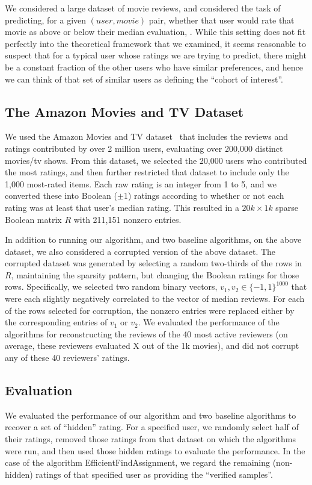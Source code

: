 \documentclass[final,12pt]{colt2018}
\begin{document}
We considered a large dataset of movie reviews, and considered the task of predicting, for a given $(user, movie)$ pair, whether that user would rate that movie as above or below their median evaluation, .  While this setting does not fit perfectly into the theoretical framework that we examined, it seems reasonable to suspect that for a typical user whose ratings we are trying to predict, there might be a constant fraction of the other users who have similar preferences, and hence we can think of that set of similar users as defining the ``cohort of interest''.

\subsection{The Amazon Movies and TV Dataset}
We used the Amazon Movies and TV dataset~\citep{db1, db2} that includes the reviews and ratings contributed by over 2 million users, evaluating over 200,000 distinct movies/tv shows.   From this dataset, we selected the 20,000 users who contributed the most ratings, and then further restricted that dataset to include only the 1,000 most-rated items.  Each raw rating is an integer from 1 to 5,  and we converted these into Boolean ($\pm 1$) ratings according to whether or not each rating was at least that user's median rating.  This resulted in a $20k \times 1k$ sparse Boolean matrix $R$ with 211,151 nonzero entries.

In addition to running our algorithm, and two baseline algorithms, on the above dataset, we also considered a corrupted version of the above dataset.  The corrupted dataset was generated by selecting a random two-thirds of the rows in $R$, maintaining the sparsity pattern, but changing the Boolean ratings for those rows.  Specifically, we selected two random binary vectors, $v_1,v_2 \in \{-1,1\}^{1000}$ that were each slightly negatively correlated to the vector of median reviews.  For each of the rows selected for corruption, the nonzero entries were replaced either by the corresponding entries of $v_1$ or $v_2$.  We evaluated the performance of the algorithms for reconstructing the reviews of the 40 most active reviewers (on average, these reviewers evaluated X out of the 1k movies), and did not corrupt any of these 40 reviewers' ratings.

\subsection{Evaluation}
We evaluated the performance of our algorithm and two baseline algorithms to recover a set of ``hidden'' rating.  For a specified user, we randomly select half of their ratings, removed those ratings from that dataset on which the algorithms were run, and then used those hidden ratings to evaluate the performance.   In the case of the algorithm EfficientFindAssignment, we regard the remaining (non-hidden) ratings of that specified user as providing the ``verified samples''.
\end{document}
